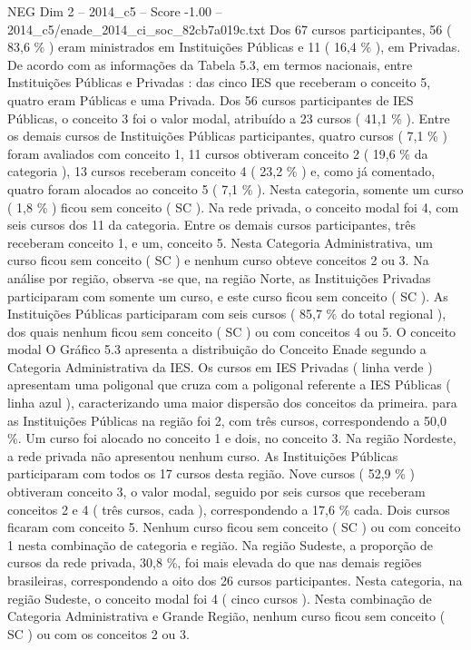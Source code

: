 \begin{textsample}{NEG Dim 2 – 2014\_c5 – Score -1.00 – 2014\_c5/enade\_2014\_ci\_soc\_82cb7a019c.txt}
Dos 67 cursos participantes, 56 ( 83,6 \% ) eram ministrados em Instituições Públicas e 11 ( 16,4 \% ), em Privadas.
De acordo com as informações da Tabela 5.3, em termos nacionais, entre Instituições Públicas e Privadas : das cinco IES que receberam o conceito 5, quatro eram Públicas e uma Privada.
Dos 56 cursos participantes de IES Públicas, o conceito 3 foi o valor modal, atribuído a 23 cursos ( 41,1 \% ).
Entre os demais cursos de Instituições Públicas participantes, quatro cursos ( 7,1 \% ) foram avaliados com conceito 1, 11 cursos obtiveram conceito 2 ( 19,6 \% da categoria ), 13 cursos receberam conceito 4 ( 23,2 \% ) e, como já comentado, quatro foram alocados ao conceito 5 ( 7,1 \% ).
Nesta categoria, somente um curso ( 1,8 \% ) ficou sem conceito ( SC ).
Na rede privada, o conceito modal foi 4, com seis cursos dos 11 da categoria.
Entre os demais cursos participantes, três receberam conceito 1, e um, conceito 5.
Nesta Categoria Administrativa, um curso ficou sem conceito ( SC ) e nenhum curso obteve conceitos 2 ou 3.
Na análise por região, observa -se que, na região Norte, as Instituições Privadas participaram com somente um curso, e este curso ficou sem conceito ( SC ).
As Instituições Públicas participaram com seis cursos ( 85,7 \% do total regional ), dos quais nenhum ficou sem conceito ( SC ) ou com conceitos 4 ou 5.
O conceito modal O Gráfico 5.3 apresenta a distribuição do Conceito Enade segundo a Categoria Administrativa da IES.
Os cursos em IES Privadas ( linha verde ) apresentam uma poligonal que cruza com a poligonal referente a IES Públicas ( linha azul ), caracterizando uma maior dispersão dos conceitos da primeira. para as Instituições Públicas na região foi 2, com três cursos, correspondendo a 50,0 \%.
Um curso foi alocado no conceito 1 e dois, no conceito 3.
Na região Nordeste, a rede privada não apresentou nenhum curso.
As Instituições Públicas participaram com todos os 17 cursos desta região.
Nove cursos ( 52,9 \% ) obtiveram conceito 3, o valor modal, seguido por seis cursos que receberam conceitos 2 e 4 ( três cursos, cada ), correspondendo a 17,6 \% cada.
Dois cursos ficaram com conceito 5.
Nenhum curso ficou sem conceito ( SC ) ou com conceito 1 nesta combinação de categoria e região.
Na região Sudeste, a proporção de cursos da rede privada, 30,8 \%, foi mais elevada do que nas demais regiões brasileiras, correspondendo a oito dos 26 cursos participantes.
Nesta categoria, na região Sudeste, o conceito modal foi 4 ( cinco cursos ).
Nesta combinação de Categoria Administrativa e Grande Região, nenhum curso ficou sem conceito ( SC ) ou com os conceitos 2 ou 3.

\end{textsample}
